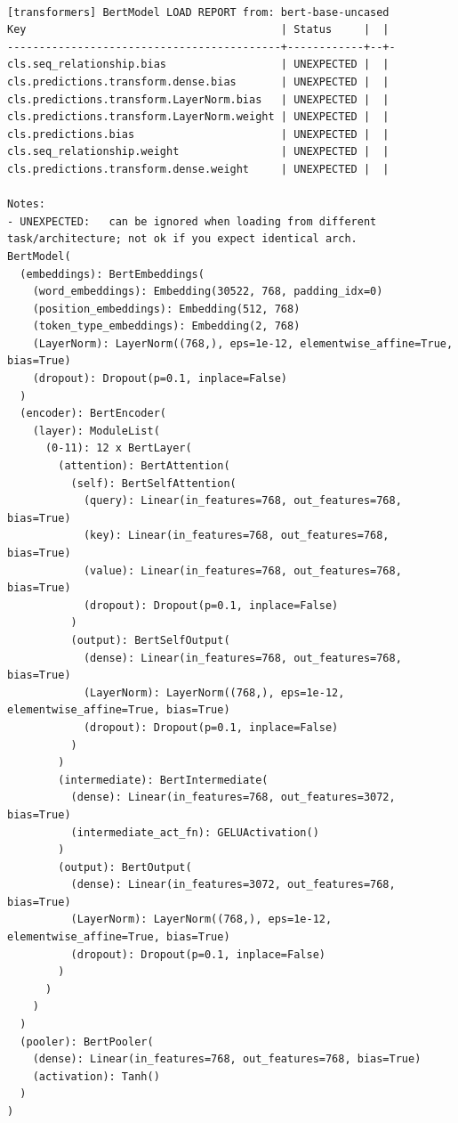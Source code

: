 \documentclass[../labs.tex]{subfiles}
\begin{document}
\begin{lstlisting}[style=terminalOutput,breakatwhitespace=false,columns=fullflexible]

[transformers] BertModel LOAD REPORT from: bert-base-uncased
Key                                        | Status     |  |
-------------------------------------------+------------+--+-
cls.seq_relationship.bias                  | UNEXPECTED |  |
cls.predictions.transform.dense.bias       | UNEXPECTED |  |
cls.predictions.transform.LayerNorm.bias   | UNEXPECTED |  |
cls.predictions.transform.LayerNorm.weight | UNEXPECTED |  |
cls.predictions.bias                       | UNEXPECTED |  |
cls.seq_relationship.weight                | UNEXPECTED |  |
cls.predictions.transform.dense.weight     | UNEXPECTED |  |

Notes:
- UNEXPECTED:	can be ignored when loading from different task/architecture; not ok if you expect identical arch.
BertModel(
  (embeddings): BertEmbeddings(
    (word_embeddings): Embedding(30522, 768, padding_idx=0)
    (position_embeddings): Embedding(512, 768)
    (token_type_embeddings): Embedding(2, 768)
    (LayerNorm): LayerNorm((768,), eps=1e-12, elementwise_affine=True, bias=True)
    (dropout): Dropout(p=0.1, inplace=False)
  )
  (encoder): BertEncoder(
    (layer): ModuleList(
      (0-11): 12 x BertLayer(
        (attention): BertAttention(
          (self): BertSelfAttention(
            (query): Linear(in_features=768, out_features=768, bias=True)
            (key): Linear(in_features=768, out_features=768, bias=True)
            (value): Linear(in_features=768, out_features=768, bias=True)
            (dropout): Dropout(p=0.1, inplace=False)
          )
          (output): BertSelfOutput(
            (dense): Linear(in_features=768, out_features=768, bias=True)
            (LayerNorm): LayerNorm((768,), eps=1e-12, elementwise_affine=True, bias=True)
            (dropout): Dropout(p=0.1, inplace=False)
          )
        )
        (intermediate): BertIntermediate(
          (dense): Linear(in_features=768, out_features=3072, bias=True)
          (intermediate_act_fn): GELUActivation()
        )
        (output): BertOutput(
          (dense): Linear(in_features=3072, out_features=768, bias=True)
          (LayerNorm): LayerNorm((768,), eps=1e-12, elementwise_affine=True, bias=True)
          (dropout): Dropout(p=0.1, inplace=False)
        )
      )
    )
  )
  (pooler): BertPooler(
    (dense): Linear(in_features=768, out_features=768, bias=True)
    (activation): Tanh()
  )
)

\end{lstlisting}
\end{document}
